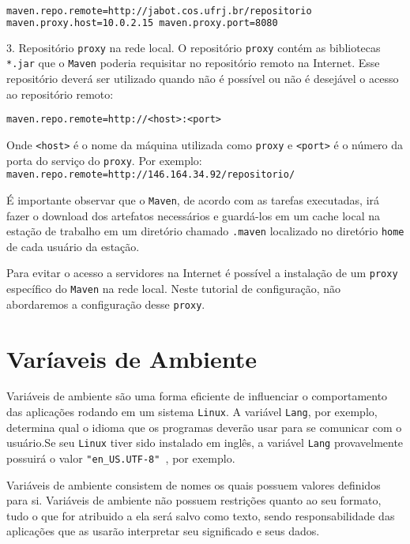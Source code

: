 \begin{lstlisting}[language=bash]
maven.repo.remote=http://jabot.cos.ufrj.br/repositorio
maven.proxy.host=10.0.2.15 maven.proxy.port=8080 
\end{lstlisting}

3. Repositório \texttt{proxy} na rede local. O repositório \texttt{proxy} contém
as bibliotecas \texttt{*.jar} que o \texttt{Maven} poderia requisitar no
repositório remoto na Internet. Esse repositório deverá ser utilizado quando não
é possível ou não é desejável o acesso ao repositório remoto:

\begin{verbatim}
maven.repo.remote=http://<host>:<port> 
\end{verbatim}

Onde \texttt{<host>} é o nome da máquina utilizada como \texttt{proxy} e
\texttt{<port>} é o número da porta do serviço do \texttt{proxy}. Por exemplo:
\texttt{maven.repo.remote=http://146.164.34.92/repositorio/}

É importante observar que o \texttt{Maven}, de acordo com as tarefas executadas,
irá fazer o download dos artefatos necessários e guardá-los em um cache local na
estação de trabalho em um diretório chamado \texttt{.maven} localizado no
diretório \texttt{home} de cada usuário da estação.

Para evitar o acesso a servidores na Internet é possível a instalação de um
\texttt{proxy} específico do \texttt{Maven} na rede local. Neste tutorial de
configuração, não abordaremos a configuração desse \texttt{proxy}.

\section{Varíaveis de Ambiente}

Variáveis de ambiente são uma forma eficiente de influenciar o comportamento das
aplicações rodando em um sistema \texttt{Linux}. A variável \texttt{Lang}, por
exemplo, determina qual o idioma que os programas deverão usar para se comunicar
com o usuário.Se seu \texttt{Linux} tiver sido instalado em inglês, a variável \texttt{Lang}
provavelmente possuirá o valor \texttt{"en\_US.UTF-8" }, por exemplo.

Variáveis de ambiente consistem de nomes os quais possuem valores definidos para
si. Variáveis de ambiente não possuem restrições quanto ao seu formato, tudo o
que for atribuido a ela será salvo como texto, sendo responsabilidade das
aplicações que as usarão interpretar seu significado e seus dados. 

